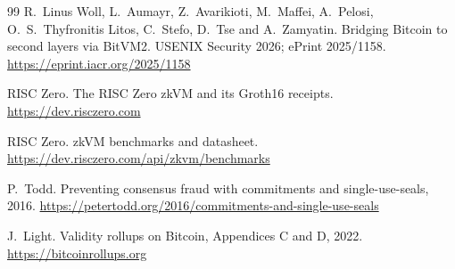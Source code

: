 \documentclass[11pt]{article}
\begin{document}
\begin{thebibliography}{99}
 R.~Linus Woll, L.~Aumayr, Z.~Avarikioti, M.~Maffei, A.~Pelosi, O.~S.~Thyfronitis Litos, C.~Stefo, D.~Tse and A.~Zamyatin. Bridging Bitcoin to second layers via BitVM2. USENIX Security 2026; ePrint 2025/1158. \url{https://eprint.iacr.org/2025/1158}

 RISC Zero. The RISC Zero zkVM and its Groth16 receipts. \url{https://dev.risczero.com}

 RISC Zero. zkVM benchmarks and datasheet. \url{https://dev.risczero.com/api/zkvm/benchmarks}

 P.~Todd. Preventing consensus fraud with commitments and single-use-seals, 2016. \url{https://petertodd.org/2016/commitments-and-single-use-seals}

 J.~Light. Validity rollups on Bitcoin, Appendices C and D, 2022. \url{https://bitcoinrollups.org}

\end{thebibliography}
\end{document}

